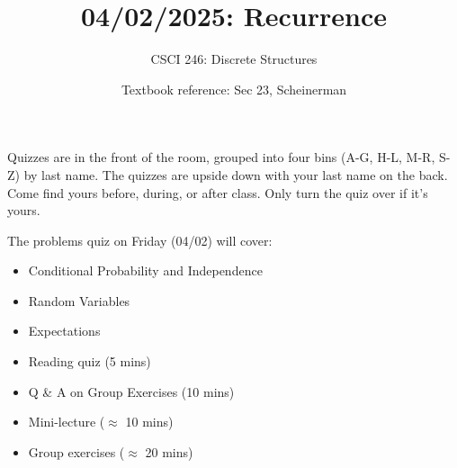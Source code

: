 \documentclass[10pt]{beamer}
\begin{document}




\title{04/02/2025: Recurrence}
\author{CSCI 246: Discrete Structures}
\date{Textbook reference: Sec 23, Scheinerman}

\begin{frame}
    \titlepage 
\end{frame}


\begin{frame}
\small
\begin{mygreenbox}[title=Graded Quiz Pickup]
Quizzes are in the front of the room, grouped into four bins (A-G, H-L, M-R, S-Z) by last name. The quizzes are upside down with your last name on the back. Come find yours before, during, or after class. Only turn the quiz over if it's yours.
\end{mygreenbox} 
\vfill 
\begin{myredbox}[title=Friday's Problems Quiz]
The problems quiz on Friday (04/02) will cover:
\begin{itemize}
\item Conditional Probability and Independence
\item Random Variables
\item Expectations	
\end{itemize}

\end{myredbox}
\vfill 
\begin{myyellowbox}[title=Today's Agenda]
\begin{itemize}
	\item Reading quiz (5 mins)
	\item Q \& A on Group Exercises (10 mins)
	\item Mini-lecture ($\approx$ 10 mins)
	\item Group exercises ($\approx$ 20 mins)
\end{itemize}


\end{myyellowbox}
\vfill 

\end{frame}
\end{document}
